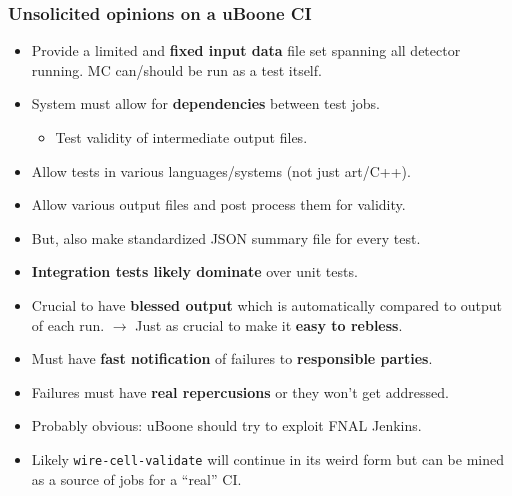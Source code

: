 \documentclass[xcolor=dvipsnames]{beamer}
\begin{document}
\begin{frame}
  \frametitle{Unsolicited opinions on a uBoone CI}
  
  \begin{itemize}\footnotesize
  \item Provide a limited and \textbf{fixed input data} file set
    spanning all detector running.  MC can/should be run as a test itself.
  \item System must allow for \textbf{dependencies} between test jobs.  
    \begin{itemize}\scriptsize
    \item Test validity of intermediate output files.
    \end{itemize}
  \item  Allow tests in various languages/systems (not just art/C++).
  \item Allow various output files and post process them for validity.
  \item But, also make standardized JSON summary file for every test.
  \item \textbf{Integration tests likely dominate} over unit tests.
  \item Crucial to have \textbf{blessed output} which is automatically compared to output of each run.
    $\to$ Just as crucial to make it \textbf{easy to rebless}.
  \item Must have \textbf{fast notification} of failures to \textbf{responsible parties}.
  \item Failures must have \textbf{real repercusions} or they won't get addressed.
  \item Probably obvious: uBoone should try to exploit FNAL Jenkins.
  \item Likely \texttt{wire-cell-validate} will continue in its weird
    form but can be mined as a source of jobs for a ``real'' CI.
  \end{itemize}
\end{frame}
\end{document}
